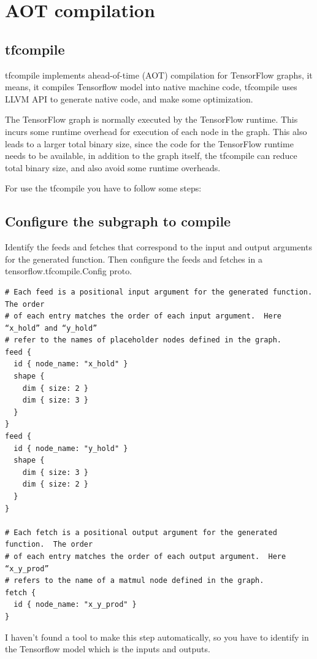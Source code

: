 \documentclass[11pt,openany]{book}
\begin{document}
\section{AOT compilation}
\subsection{tfcompile}

tfcompile implements ahead-of-time (AOT) compilation for TensorFlow graphs, it means, it compiles Tensorflow model into native machine code, tfcompile uses LLVM API to generate native code, and make some optimization.

The TensorFlow graph is normally executed by the TensorFlow runtime. This incurs some runtime overhead for execution of each node in the graph. This also leads to a larger total binary size, since the code for the TensorFlow runtime needs to be available, in addition to the graph itself, the tfcompile can reduce total binary size, and also avoid some runtime overheads.

For use the tfcompile you have to follow some steps:

\subsection{Configure the subgraph to compile}

Identify the feeds and fetches that correspond to the input and output arguments for the generated function. Then configure the feeds and fetches in a tensorflow.tfcompile.Config proto.

\begin{verbatim}
# Each feed is a positional input argument for the generated function.  The order
# of each entry matches the order of each input argument.  Here “x_hold” and “y_hold”
# refer to the names of placeholder nodes defined in the graph.
feed {
  id { node_name: "x_hold" }
  shape {
    dim { size: 2 }
    dim { size: 3 }
  }
}
feed {
  id { node_name: "y_hold" }
  shape {
    dim { size: 3 }
    dim { size: 2 }
  }
}

# Each fetch is a positional output argument for the generated function.  The order
# of each entry matches the order of each output argument.  Here “x_y_prod”
# refers to the name of a matmul node defined in the graph.
fetch {
  id { node_name: "x_y_prod" }
}
\end{verbatim}

I haven't found a tool to make this step automatically, so you have to identify in the Tensorflow model which is the inputs and outputs.
\end{document}
